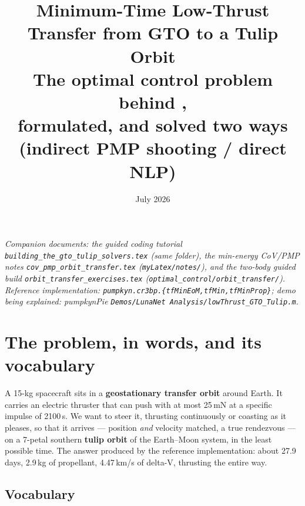 \documentclass[11pt,letterpaper]{article}
\title{\textbf{Minimum-Time Low-Thrust Transfer from GTO to a Tulip Orbit}\\[6pt]
\large The optimal control problem behind \code{lowThrust\_GTO\_Tulip.m},\\
formulated, and solved two ways (indirect PMP shooting / direct NLP)}
\author{}
\date{July 2026}
\theoremstyle{noteplain}
\newcommand{\code}[1]{\texttt{#1}}
\begin{document}
\maketitle

\noindent\textit{Companion documents: the guided coding tutorial
\code{building\_the\_gto\_tulip\_solvers.tex} (same folder), the min-energy
CoV/PMP notes \code{cov\_pmp\_orbit\_transfer.tex} (\code{myLatex/notes/}),
and the two-body guided build \code{orbit\_transfer\_exercises.tex}
(\code{optimal\_control/orbit\_transfer/}). Reference implementation:
\code{pumpkyn.cr3bp.\{tfMinEoM,tfMin,tfMinProp\}}; demo being explained:
pumpkynPie \code{Demos/LunaNet Analysis/lowThrust\_GTO\_Tulip.m}.}

\section{The problem, in words, and its vocabulary}

A 15-kg spacecraft sits in a \textbf{geostationary transfer orbit} around
Earth. It carries an electric thruster that can push with at most 25\,mN at a
specific impulse of 2100\,s. We want to steer it, thrusting continuously or
coasting as it pleases, so that it arrives --- position \emph{and} velocity
matched, a true rendezvous --- on a 7-petal southern \textbf{tulip orbit} of the
Earth--Moon system, in the least possible time. The answer produced by the
reference implementation: about 27.9 days, 2.9\,kg of propellant, 4.47\,km/s
of delta-V, thrusting the entire way.

\subsection*{Vocabulary}
\end{document}
